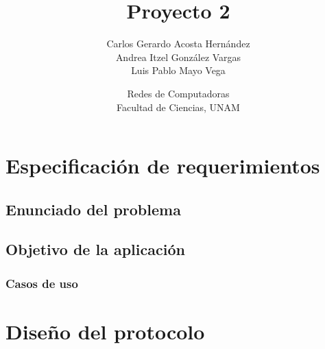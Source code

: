 \documentclass[12pt]{article}
\title{Proyecto 2}
\author{Carlos Gerardo Acosta Hernández \\ Andrea Itzel González Vargas \\ Luis Pablo Mayo Vega}
\date{Redes de Computadoras\\Facultad de Ciencias, UNAM}
\begin{document}
\maketitle
\tableofcontents
\newpage
\section{Especificación de requerimientos}
\subsection{Enunciado del problema}
\subsection{Objetivo de la aplicación}
\subsubsection{Casos de uso}
\section{Diseño del protocolo}
\end{document}
